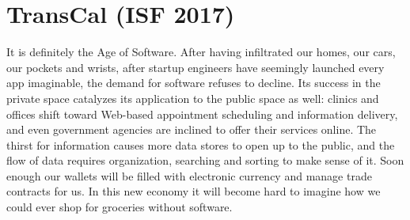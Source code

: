 \documentclass{article}
\begin{document}
\section*{TransCal (ISF 2017)}

It is definitely the Age of Software.
After having infiltrated our homes, our cars, our pockets and wrists,
after startup engineers have seemingly launched every app imaginable,
the demand for software refuses to decline.
Its success in the private space catalyzes its application to the public
space as well: clinics and offices shift toward Web-based appointment
scheduling and information delivery, and even government agencies are
inclined to offer their services online.
The thirst for information causes more data stores to open up to the
public, and the flow of data requires organization, searching and sorting
to make sense of it.
Soon enough our wallets will be filled with electronic currency and
manage trade contracts for us.
In this new economy it will become hard to imagine how we could ever
shop for groceries without software.



\end{document}
